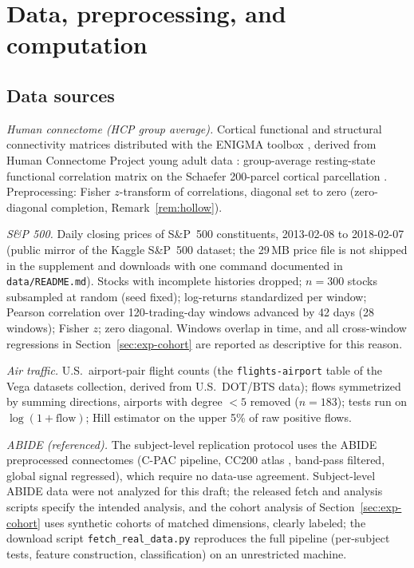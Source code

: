 \section{Data, preprocessing, and computation}
\label{supp:data}

\subsection{Data sources}

\emph{Human connectome (HCP group average).} Cortical functional and
structural connectivity matrices distributed with the ENIGMA toolbox
\citep{lariviere2021enigma}, derived from Human Connectome Project young
adult data \citep{vanessen2013wu}: group-average resting-state functional
correlation matrix on the Schaefer 200-parcel cortical parcellation
\citep{schaefer2018local}. Preprocessing: Fisher $z$-transform of
correlations, diagonal set to zero (zero-diagonal completion,
Remark~\ref{rem:hollow}).

\emph{S\&P 500.} Daily closing prices of S\&P~500 constituents,
2013-02-08 to 2018-02-07 (public mirror of the Kaggle S\&P~500 dataset;
the 29\,MB price file is not shipped in the supplement and downloads with
one command documented in \texttt{data/README.md}). Stocks with
incomplete histories dropped; $n=300$ stocks subsampled at random (seed
fixed); log-returns standardized per window; Pearson correlation over
120-trading-day windows advanced by 42 days (28 windows); Fisher $z$;
zero diagonal. Windows overlap in time, and all cross-window regressions
in Section~\ref{sec:exp-cohort} are reported as descriptive for this
reason.

\emph{Air traffic.} U.S.\ airport-pair flight counts (the
\texttt{flights-airport} table of the Vega datasets collection, derived
from U.S.\ DOT/BTS data); flows symmetrized by summing directions,
airports with degree $<5$ removed ($n=183$); tests run on
$\log(1+\mathrm{flow})$; Hill estimator on the upper 5\% of raw positive
flows.

\emph{ABIDE (referenced).} The subject-level replication protocol uses
the ABIDE preprocessed connectomes
\citep{craddock2013neuro,dimartino2014autism} (C-PAC pipeline, CC200
atlas \citep{craddock2012whole}, band-pass filtered, global signal
regressed), which require no data-use agreement. Subject-level ABIDE data were not analyzed for this draft; the
released fetch and analysis scripts specify the intended analysis,
and the cohort analysis of Section~\ref{sec:exp-cohort} uses
synthetic cohorts of
matched dimensions, clearly labeled; the download script
\texttt{fetch\_real\_data.py} reproduces the full pipeline (per-subject
tests, feature construction, classification) on an unrestricted machine.

